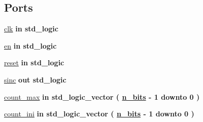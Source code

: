 \subsection*{Ports}
 \begin{DoxyCompactItemize}
\item 
\hyperlink{classcontador_a4a4609c199d30b3adebbeb3a01276ec5}{clk}  {\bfseries {\bfseries \textcolor{keywordflow}{in}\textcolor{vhdlchar}{ }}} {\bfseries \textcolor{comment}{std\+\_\+logic}\textcolor{vhdlchar}{ }} 
\item 
\hyperlink{classcontador_adcf9c6f5161d039addbda5819bee64a3}{en}  {\bfseries {\bfseries \textcolor{keywordflow}{in}\textcolor{vhdlchar}{ }}} {\bfseries \textcolor{comment}{std\+\_\+logic}\textcolor{vhdlchar}{ }} 
\item 
\hyperlink{classcontador_aad8dc6359d9e23dabcbf342fadf2fa06}{reset}  {\bfseries {\bfseries \textcolor{keywordflow}{in}\textcolor{vhdlchar}{ }}} {\bfseries \textcolor{comment}{std\+\_\+logic}\textcolor{vhdlchar}{ }} 
\item 
\hyperlink{classcontador_aae281cf725515894f893258c629a59c7}{sinc}  {\bfseries {\bfseries \textcolor{keywordflow}{out}\textcolor{vhdlchar}{ }}} {\bfseries \textcolor{comment}{std\+\_\+logic}\textcolor{vhdlchar}{ }} 
\item 
\hyperlink{classcontador_a9d661c671094e58facccf572c8b9f99c}{count\+\_\+max}  {\bfseries {\bfseries \textcolor{keywordflow}{in}\textcolor{vhdlchar}{ }}} {\bfseries \textcolor{comment}{std\+\_\+logic\+\_\+vector}\textcolor{vhdlchar}{ }\textcolor{vhdlchar}{(}\textcolor{vhdlchar}{ }\textcolor{vhdlchar}{ }\textcolor{vhdlchar}{ }\textcolor{vhdlchar}{ }{\bfseries \hyperlink{classcontador_a986eb173f34190032418b47b9fc9b457}{n\+\_\+bits}} \textcolor{vhdlchar}{-\/}\textcolor{vhdlchar}{ } \textcolor{vhdldigit}{1} \textcolor{vhdlchar}{ }\textcolor{keywordflow}{downto}\textcolor{vhdlchar}{ }\textcolor{vhdlchar}{ } \textcolor{vhdldigit}{0} \textcolor{vhdlchar}{ }\textcolor{vhdlchar}{)}\textcolor{vhdlchar}{ }} 
\item 
\hyperlink{classcontador_a224726764c54552090019aa60b48d801}{count\+\_\+ini}  {\bfseries {\bfseries \textcolor{keywordflow}{in}\textcolor{vhdlchar}{ }}} {\bfseries \textcolor{comment}{std\+\_\+logic\+\_\+vector}\textcolor{vhdlchar}{ }\textcolor{vhdlchar}{(}\textcolor{vhdlchar}{ }\textcolor{vhdlchar}{ }\textcolor{vhdlchar}{ }\textcolor{vhdlchar}{ }{\bfseries \hyperlink{classcontador_a986eb173f34190032418b47b9fc9b457}{n\+\_\+bits}} \textcolor{vhdlchar}{-\/}\textcolor{vhdlchar}{ } \textcolor{vhdldigit}{1} \textcolor{vhdlchar}{ }\textcolor{keywordflow}{downto}\textcolor{vhdlchar}{ }\textcolor{vhdlchar}{ } \textcolor{vhdldigit}{0} \textcolor{vhdlchar}{ }\textcolor{vhdlchar}{)}\textcolor{vhdlchar}{ }} 

\end{DoxyCompactItemize}
